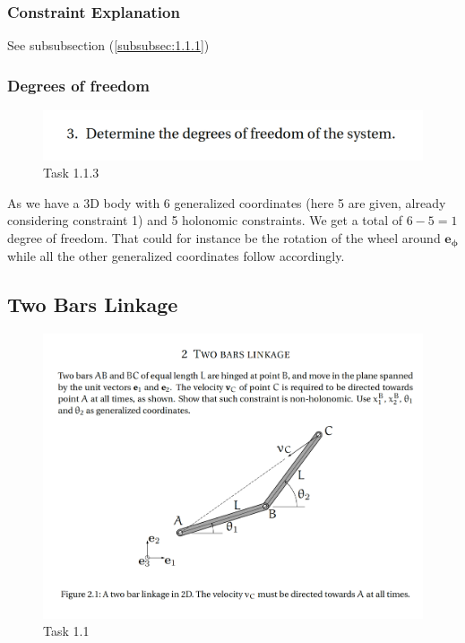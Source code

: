 \subsubsection{Constraint Explanation}
See subsubsection (\ref{subsubsec:1.1.1})
\subsubsection{Degrees of freedom}

\begin{figure}[ht]
    \centering
    \includegraphics[scale=0.4]{images/1.1.3.png}
    \caption{Task 1.1.3}
    \label{fig:task1.1.3}
\end{figure}

\noindent As we have a 3D body with 6 generalized coordinates (here 5 are given, already considering constraint 1) and 5 holonomic constraints. We get a total of $6 - 5 = 1$ degree of freedom. That could for instance be the rotation of the wheel around $\boldsymbol{e_\phi}$ while all the other generalized coordinates follow accordingly.

\subsection{Two Bars Linkage}\label{subsec:1.2}
\begin{figure}[ht]
    \centering
    \includegraphics[scale=0.4]{images/1.2.png}
    \caption{Task 1.1}
    \label{fig:task1.2}
\end{figure}

